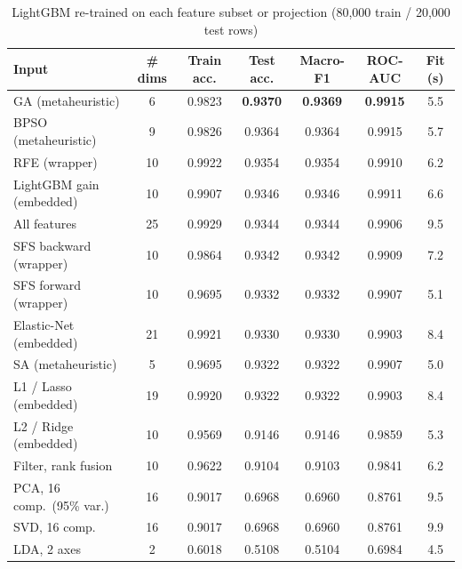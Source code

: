 \begin{table}[!t]
\caption{LightGBM re-trained on each feature subset or projection (80{,}000 train / 20{,}000 test rows)}
\label{tab:subsets}
\centering
\begin{tabular}{lcccccc}
\toprule
Input & \# dims & Train acc. & Test acc. & Macro-F1 & ROC-AUC & Fit (s) \\
\midrule
GA (metaheuristic) & 6 & 0.9823 & \textbf{0.9370} & \textbf{0.9369} & \textbf{0.9915} & 5.5 \\
BPSO (metaheuristic) & 9 & 0.9826 & 0.9364 & 0.9364 & 0.9915 & 5.7 \\
RFE (wrapper) & 10 & 0.9922 & 0.9354 & 0.9354 & 0.9910 & 6.2 \\
LightGBM gain (embedded) & 10 & 0.9907 & 0.9346 & 0.9346 & 0.9911 & 6.6 \\
All features & 25 & 0.9929 & 0.9344 & 0.9344 & 0.9906 & 9.5 \\
SFS backward (wrapper) & 10 & 0.9864 & 0.9342 & 0.9342 & 0.9909 & 7.2 \\
SFS forward (wrapper) & 10 & 0.9695 & 0.9332 & 0.9332 & 0.9907 & 5.1 \\
Elastic-Net (embedded) & 21 & 0.9921 & 0.9330 & 0.9330 & 0.9903 & 8.4 \\
SA (metaheuristic) & 5 & 0.9695 & 0.9322 & 0.9322 & 0.9907 & 5.0 \\
L1 / Lasso (embedded) & 19 & 0.9920 & 0.9322 & 0.9322 & 0.9903 & 8.4 \\
L2 / Ridge (embedded) & 10 & 0.9569 & 0.9146 & 0.9146 & 0.9859 & 5.3 \\
Filter, rank fusion & 10 & 0.9622 & 0.9104 & 0.9103 & 0.9841 & 6.2 \\
PCA, 16 comp.\ (95\% var.) & 16 & 0.9017 & 0.6968 & 0.6960 & 0.8761 & 9.5 \\
SVD, 16 comp. & 16 & 0.9017 & 0.6968 & 0.6960 & 0.8761 & 9.9 \\
LDA, 2 axes & 2 & 0.6018 & 0.5108 & 0.5104 & 0.6984 & 4.5 \\
\bottomrule
\end{tabular}
\end{table}

